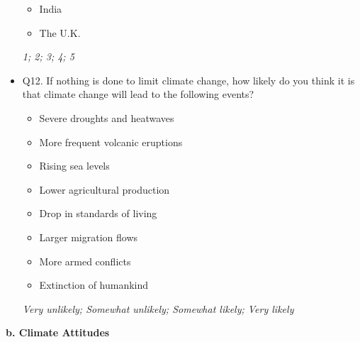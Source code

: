 \documentclass{article}
\begin{document}
\begin{itemize}
\begin{itemize}
            \item India
            \item The U.K.
        \end{itemize}
    \textit{1; 2; 3; 4; 5}
    \item Q12. If nothing is done to limit climate change, how likely do you think it is that climate change will lead to the following events?
        \begin{itemize}
            \item Severe droughts and heatwaves
            \item More frequent volcanic eruptions
            \item Rising sea levels
            \item Lower agricultural production
            \item Drop in standards of living
            \item Larger migration flows
            \item More armed conflicts
            \item Extinction of humankind
        \end{itemize}
    \textit{Very unlikely; Somewhat unlikely; Somewhat likely; Very likely}
\end{itemize}

\begin{flushleft}
\textbf{b. Climate Attitudes}
\end{flushleft}
\end{document}
